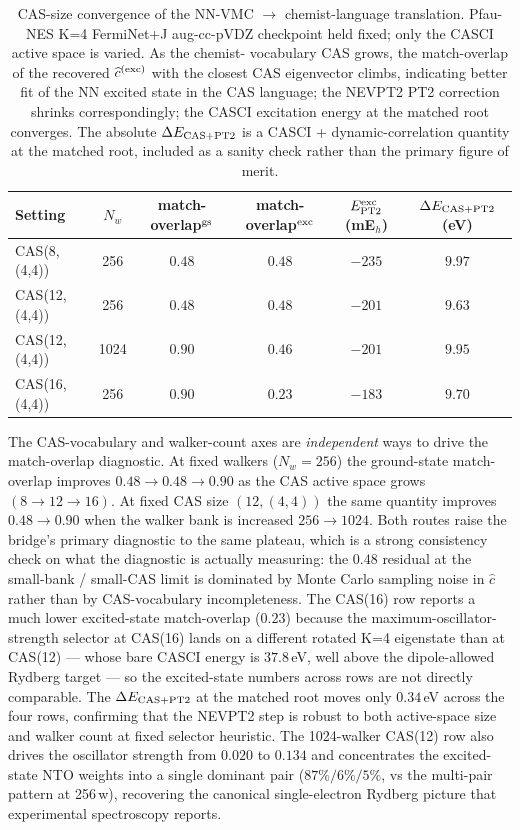 \documentclass[journal=jctcce,manuscript=suppinfo,layout=traditional]{achemso}
\begin{document}
\begin{table}[h]
\centering
\caption{CAS-size convergence of the NN-VMC $\to$ chemist-language
translation. Pfau-NES K=4 FermiNet+J aug-cc-pVDZ checkpoint held
fixed; only the CASCI active space is varied. As the chemist-
vocabulary CAS grows, the match-overlap of the recovered
$\widehat c^{({\rm exc})}$ with the closest CAS eigenvector
climbs, indicating better fit of the NN excited state in the
CAS language; the NEVPT2 PT2 correction shrinks correspondingly;
the CASCI excitation energy at the matched root converges. The
absolute $\Delta E_{\rm CAS+PT2}$ is a CASCI + dynamic-correlation
quantity at the matched root, included as a sanity check rather
than the primary figure of merit.}
\label{tab:cas_size_convergence}
\small
\begin{tabular}{lccccc}
\hline
Setting & $N_w$ & match-overlap${}^{\rm gs}$ &
match-overlap${}^{\rm exc}$ &
$E_{\rm PT2}^{\rm exc}$ (mE$_h$) &
$\Delta E_{\rm CAS+PT2}$ (eV) \\
\hline
CAS(8,(4,4))    & 256  & $0.48$ & $0.48$       & $-235$ & $9.97$ \\
CAS(12,(4,4))   & 256  & $0.48$ & $0.48$       & $-201$ & $9.63$ \\
CAS(12,(4,4))   & 1024 & $\mathbf{0.90}$ & $0.46$ & $-201$ & $9.95$ \\
CAS(16,(4,4))   & 256  & $\mathbf{0.90}$ & $0.23$ & $-183$ & $9.70$ \\
\hline
\end{tabular}
\end{table}

\noindent The CAS-vocabulary and walker-count axes are
\emph{independent} ways to drive the match-overlap diagnostic. At
fixed walkers ($N_w=256$) the ground-state match-overlap improves
$0.48 \to 0.48 \to 0.90$ as the CAS active space grows
$(8 \to 12 \to 16)$. At fixed CAS size $(12,(4,4))$ the same
quantity improves $0.48 \to 0.90$ when the walker bank is increased
$256 \to 1024$. Both routes raise the bridge's primary diagnostic
to the same plateau, which is a strong consistency check on what
the diagnostic is actually measuring: the $0.48$ residual at the
small-bank / small-CAS limit is dominated by Monte Carlo sampling
noise in $\widehat c$ rather than by CAS-vocabulary incompleteness.
The CAS(16) row reports a much lower excited-state match-overlap
($0.23$) because the maximum-oscillator-strength selector at CAS(16)
lands on a different rotated K=4 eigenstate than at CAS(12) ---
whose bare CASCI energy is $37.8$\,eV, well above the
dipole-allowed Rydberg target --- so the excited-state numbers
across rows are not directly comparable. The $\Delta E_{\rm CAS+PT2}$
at the matched root moves only $0.34$\,eV across the four rows,
confirming that the NEVPT2 step is robust to both active-space size
and walker count at fixed selector heuristic. The 1024-walker
CAS(12) row also drives the oscillator strength from $0.020$ to
$0.134$ and concentrates the excited-state NTO weights into a
single dominant pair ($87\%/6\%/5\%$, vs the multi-pair pattern at
256\,w), recovering the canonical single-electron Rydberg picture
that experimental spectroscopy reports.
\end{document}
